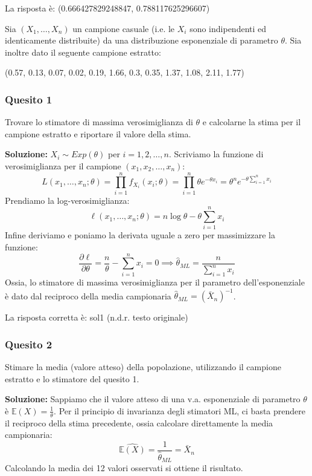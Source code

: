 \documentclass[12pt, a4paper]{article}
\begin{document}
La risposta è: (0.666427829248847, 0.788117625296607)

\newpage

\vspace{0.5cm}
\begin{tcolorbox}[colback=lightergray!10, colframe=tocsec, title=\textbf{Esercizio 2}]
Sia $(X_1,\dots,X_n)$ un campione casuale (i.e. le $X_i$ sono indipendenti ed identicamente distribuite) da una distribuzione esponenziale di parametro $\theta$.
Sia inoltre dato il seguente campione estratto:
\begin{center}
(0.57, 0.13, 0.07, 0.02, 0.19, 1.66, 0.3, 0.35, 1.37, 1.08, 2.11, 1.77)
\end{center}
\end{tcolorbox}

\subsubsection*{Quesito 1}
Trovare lo stimatore di massima verosimiglianza di $\theta$ e calcolarne la stima per il campione estratto e riportare il valore della stima.

\textbf{Soluzione:}
$X_i \sim Exp(\theta)$ per $i=1,2,\dots,n$.
Scriviamo la funzione di verosimiglianza per il campione $(x_1, x_2, \dots, x_n)$:
$$ L(x_1, \dots, x_n; \theta) = \prod_{i=1}^n f_{X_i}(x_i; \theta) = \prod_{i=1}^n \theta e^{-\theta x_i} = \theta^n e^{-\theta \sum_{i=1}^n x_i} $$
Prendiamo la log-verosimiglianza:
$$ \ell(x_1, \dots, x_n; \theta) = n\log\theta - \theta\sum_{i=1}^n x_i $$
Infine deriviamo e poniamo la derivata uguale a zero per massimizzare la funzione:
$$ \frac{\partial \ell}{\partial \theta} = \frac{n}{\theta} - \sum_{i=1}^n x_i = 0 \implies \hat{\theta}_{ML} = \frac{n}{\sum_{i=1}^n x_i} $$
Ossia, lo stimatore di massima verosimiglianza per il parametro dell’esponenziale è dato dal reciproco della media campionaria $\hat{\theta}_{ML} = (\bar{X}_n)^{-1}$.

La risposta corretta è: sol1 (n.d.r. testo originale)

\subsubsection*{Quesito 2}
Stimare la media (valore atteso) della popolazione, utilizzando il campione estratto e lo stimatore del quesito 1.

\textbf{Soluzione:}
Sappiamo che il valore atteso di una v.a. esponenziale di parametro $\theta$ è $\mathbb{E}(X) = \frac{1}{\theta}$. Per il principio di invarianza degli stimatori ML, ci basta prendere il reciproco della stima precedente, ossia calcolare direttamente la media campionaria:
$$ \widehat{\mathbb{E}(X)} = \frac{1}{\hat{\theta}_{ML}} = \bar{X}_n $$
Calcolando la media dei 12 valori osservati si ottiene il risultato.
\end{document}

